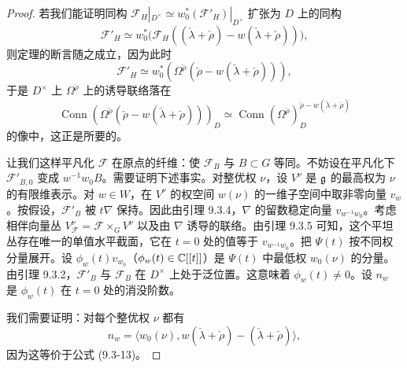 \begin{proof}
若我们能证明同构 $\mathcal{F}_H|_{D^\times}\simeq w_0^*(\mathcal{F}'_H)|_{D^\times}$ 扩张为 $D$ 上的同构
\begin{equation}
\mathcal{F}'_H\simeq w_0^*\bigl(\mathcal F_H((\check\lambda+\check\rho)-w(\check\lambda+\check\rho))\bigr),
\tag{9.3-13}
\end{equation}
则定理的断言随之成立，因为此时
\[
\mathcal{F}'_H\simeq w_0^*(\Omega^{\check\rho}(\check\rho-w(\check\lambda+\check\rho))),
\]
于是 $D^\times$ 上 $\Omega^{\check\rho}$ 上的诱导联络落在
\[
\operatorname{Conn}(\Omega^{\check\rho}(\check\rho-w(\check\lambda+\check\rho)))_D\simeq\operatorname{Conn}(\Omega^{\check\rho})^{\check\rho-w(\check\lambda+\check\rho)}_D
\]
的像中，这正是所要的。

让我们这样平凡化 $\mathcal{F}$ 在原点的纤维：使 $\mathcal{F}_B$ 与 $B\subset G$ 等同。不妨设在平凡化下 $\mathcal{F}'_{B,0}$ 变成 $w^{-1}w_0B$。需要证明下述事实。对整优权 $\nu$，设 $V^\nu$ 是 $\mathfrak{g}$ 的最高权为 $\nu$ 的有限维表示。对 $w\in W$，在 $V^\nu$ 的权空间 $w(\nu)$ 的一维子空间中取非零向量 $v_w$。按假设，$\mathcal{F}'_B$ 被 $t\nabla$ 保持。因此由引理 9.3.4，$\nabla$ 的留数稳定向量 $v_{w^{-1}w_0}$。考虑相伴向量丛 $V^\nu_{\mathcal{F}} = \mathcal{F}\times_G V^\nu$ 以及由 $\nabla$ 诱导的联络。由引理 9.3.5 可知，这个平坦丛存在唯一的单值水平截面，它在 $t=0$ 处的值等于 $v_{w^{-1}w_0}$。把 $\Psi(t)$ 按不同权分量展开。设 $\phi_w(t)v_{w_0}$（$\phi_w(t)\in\mathbb{C}[[t]]$）是 $\Psi(t)$ 中最低权 $w_0(\nu)$ 的分量。由引理 9.3.2，$\mathcal{F}'_B$ 与 $\mathcal{F}_B$ 在 $D^\times$ 上处于泛位置。这意味着 $\phi_w(t)\ne 0$。设 $n_w$ 是 $\phi_w(t)$ 在 $t=0$ 处的消没阶数。

我们需要证明：对每个整优权 $\nu$ 都有
\begin{equation}
n_w = \langle w_0(\nu), w(\check\lambda+\check\rho)-(\check\lambda+\check\rho)\rangle,
\tag{9.3-14}
\end{equation}
因为这等价于公式 (9.3-13)。


\end{proof}
